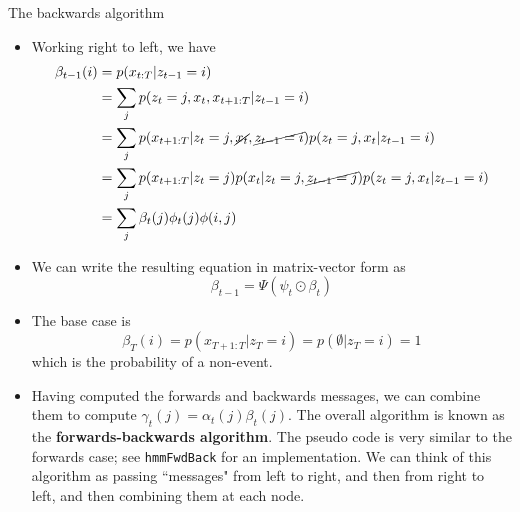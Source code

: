 \documentclass[10pt,mathserif]{beamer}
\begin{document}
\begin{frame}{The backwards algorithm}
\begin{itemize}
    \item Working right to left, we have
    \begin{equation}
        \begin{split}
            \beta_{t-1}(i) & = p(x_{t:T}|z_{t-1}=i)\\
            & = \sum_j p(z_t =j,x_t,x_{t+1:T}|z_{t-1} =i)\\
            & = \sum_j p(x_{t+1:T} |z_t =j,\cancel{x_t},\cancel{z_{t-1} =i})p(z_t =j,x_t |z_{t-1} =i)\\
            & = \sum_j p(x_{t+1:T} |z_t =j) p(x_t|z_t=j,\cancel{z_{t-1}=j})p(z_t =j,x_t |z_{t-1} =i)\\
            &  = \sum_j\beta_t(j)\phi_t(j)\phi(i,j)
        \end{split}
    \end{equation}
    
    \item We can write the resulting equation in matrix-vector form as
    \begin{equation}
        \beta_{t-1} = \Psi(\psi_t \odot \beta_t)
    \end{equation}
    
    \item The base case is
    \begin{equation}
        \beta_T(i) = p(x_{T+1:T}|z_T = i) = p(\emptyset|z_T = i) = 1
    \end{equation}
    which is the probability of a non-event.
    
    \item Having computed the forwards and backwards messages, we can combine them to compute $\gamma_t(j) = \alpha_t(j)\beta_t(j)$. The overall algorithm is known as the \textbf{forwards-backwards algorithm}. The pseudo code is very similar to the forwards case; see \texttt{hmmFwdBack} for an implementation. We can think of this algorithm as passing ``messages" from left to right, and then from right to left, and then combining them at each node.
\end{itemize}
\end{frame}
\end{document}
